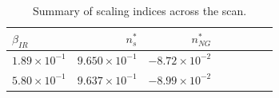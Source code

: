     \\
    \\
\begin{table}[h!]
  \begin{center}
    \begin{tabular}{lrrrrrrr}
        \toprule
        $\beta_{IR}$ &  $n_s^{*}$ &  $n_{NG}^{*}$\\
        \midrule
        $1.89\times 10^{-1}$  &  $9.650\times 10^{-1}$  &  $-8.72\times 10^{-2}$\\
        $5.80\times 10^{-1}$  &  $9.637\times 10^{-1}$  &  $-8.99\times 10^{-2}$\\
        \bottomrule
    \end{tabular}
    \caption{Summary of scaling indices across the scan.}\label{tab:scan_summary_ns}
  \end{center}
\end{table}


